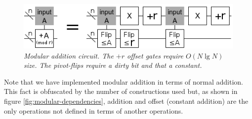 \documentclass[twocolumn]{article}
\begin{document}
\begin{figure}
  \centering
  \includegraphics[totalheight=1.7cm]{modular-addition.png}
  \caption{\em Modular addition circuit.
  The $+r$ offset gates require $O(N \lg N)$ size.
  The pivot-flips require a dirty bit and that a constant.}
  \label{fig:modular-add}
\end{figure}

Note that we have implemented modular addition in terms of normal addition.
This fact is obfuscated by the number of constructions used but, as shown in figure \ref{fig:modular-dependencies}, addition and offset (constant addition) are the only operations not defined in terms of another operations.
\end{document}
